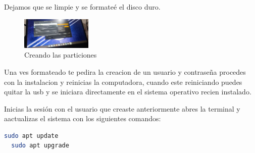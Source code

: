 Dejamos que se limpie y se formateé el disco duro. 

\begin{figure}[h]
  \begin{center}
    \includegraphics[width=0.3\textwidth]{img/particionado.jpeg}
  \end{center}
  \caption{Creando las particiones}\label{fig:particionado}
\end{figure}


Una ves formateado te pedira la creacion de un usuario y contraseña procedes con la instalacion y reinicias la computadora, cuando este reiniciando puedes quitar la usb y se iniciara directamente en el sistema operativo recien instalado. 

Inicias la sesión con el usuario que creaste anteriormente abres la terminal y aactualizas el sistema con los siguientes comandos:

\begin{lstlisting}[language=Bash]
  sudo apt update
  sudo apt upgrade
\end{lstlisting}

